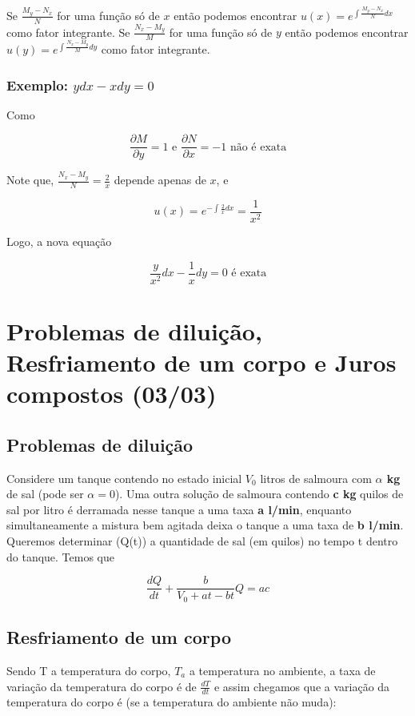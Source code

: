 \documentclass{article}
\begin{document}
Se $\frac{M_y - N_x}{N}$ for uma função só de $x$ então podemos encontrar $u(x) = e^{\int \frac{M_y - N_x}{N} d x}$ como fator integrante. Se $\frac{N_x - M_y}{M}$ for uma função só de $y$ então podemos encontrar $u(y) = e^{\int \frac{N_x - M_y}{M} d y}$ como fator integrante.

\subsubsection*{Exemplo: $y d x - x d y = 0$}
Como

$$\dfrac{\partial M}{\partial y} = 1 \text{ e } \dfrac{\partial N}{\partial x} = -1 \text{ não é exata}$$

Note que, $\frac{N_x - M_y}{N} = \frac{2}{x}$ depende apenas de $x$, e

$$u(x) = e^{-\int \frac{2}{x} d x} = \dfrac{1}{x^2}$$

Logo, a nova equação

$$\dfrac{y}{x^2} d x - \dfrac{1}{x} d y = 0 \text{ é exata}$$

\section*{Problemas de diluição, Resfriamento de um corpo e Juros compostos (03/03)}
\label{s4}
\subsection*{Problemas de diluição}
Considere um tanque contendo no estado inicial $V_0$ litros de salmoura com \textbf{$\alpha$ kg} de sal (pode ser $\alpha = 0$).
Uma outra solução de salmoura contendo \textbf{c kg} quilos de sal por litro é derramada nesse tanque a uma taxa \textbf{a l/min}, enquanto simultaneamente a mistura bem agitada deixa o tanque a uma taxa de \textbf{b l/min}. Queremos determinar (Q(t)) a quantidade de sal (em quilos) no tempo t dentro do tanque. Temos que

$$\dfrac{d Q}{d t} + \dfrac{b}{V_0 + a t - b t} Q = a c$$

\subsection*{Resfriamento de um corpo}
Sendo T a temperatura do corpo, $T_a$ a temperatura no ambiente, a taxa de variação da temperatura do corpo é de $\frac{d T}{d t}$ e assim chegamos que a variação da temperatura do corpo é (se a temperatura do ambiente não muda):
\end{document}
